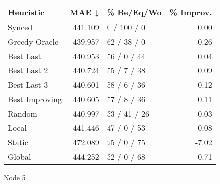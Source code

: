 \begin{tabular}{lrlr}
\toprule
\textbf{Heuristic} & \textbf{MAE ↓} & \textbf{\% Be/Eq/Wo} & \textbf{\% Improv.} \\
\midrule
            Synced &        441.109 &          0 / 100 / 0 &                0.00 \\
     Greedy Oracle &        439.957 &          62 / 38 / 0 &                0.26 \\
         Best Last &        440.953 &          56 / 0 / 44 &                0.04 \\
       Best Last 2 &        440.724 &          55 / 7 / 38 &                0.09 \\
       Best Last 3 &        440.601 &          58 / 6 / 36 &                0.12 \\
    Best Improving &        440.605 &          57 / 8 / 36 &                0.11 \\
            Random &        440.997 &         33 / 41 / 26 &                0.03 \\
             Local &        441.446 &          47 / 0 / 53 &               -0.08 \\
            Static &        472.089 &          25 / 0 / 75 &               -7.02 \\
            Global &        444.252 &          32 / 0 / 68 &               -0.71 \\
\bottomrule
\end{tabular}
\caption{Node 5}
\label{tab:iid_lr01_le2_bs4_5}
